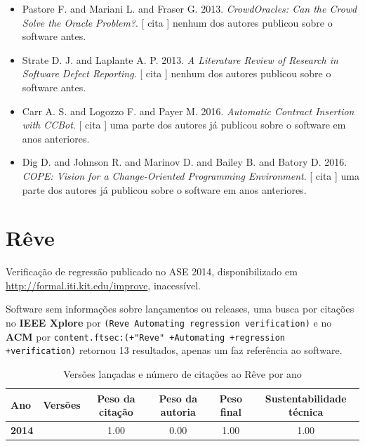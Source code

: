 \begin{itemize}
\item Pastore F. and Mariani L. and Fraser G.
      2013.
        \textit{ CrowdOracles: Can the Crowd Solve the Oracle Problem?}.
      [
          cita
      ]
nenhum dos autores publicou sobre o software antes.
\item Strate D. J. and Laplante A. P.
      2013.
        \textit{ A Literature Review of Research in Software Defect Reporting}.
      [
          cita
      ]
nenhum dos autores publicou sobre o software antes.
\item Carr A. S. and Logozzo F. and Payer M.
      2016.
        \textit{ Automatic Contract Insertion with CCBot}.
      [
          cita
      ]
uma parte dos autores já publicou sobre o software em anos anteriores.
\item Dig D. and Johnson R. and Marinov D. and Bailey B. and Batory D.
      2016.
        \textit{ COPE: Vision for a Change-Oriented Programming Environment}.
      [
          cita
      ]
uma parte dos autores já publicou sobre o software em anos anteriores.
\end{itemize}
\section{Rêve}

Verificação de regressão
publicado no ASE 2014,
disponibilizado em \url{http://formal.iti.kit.edu/improve},
inacessível.

Software sem informações sobre lançamentos ou releases,
uma busca por citações no {\bf IEEE Xplore} por
\texttt{(Reve Automating regression verification)}
e no {\bf ACM} por
\texttt{content.ftsec:(+"Reve" +Automating +regression +verification)}
retornou
13 resultados,
apenas um faz referência ao software.


\begin{table}[H]
\caption{Versões lançadas e número de citações ao Rêve por ano}
\centering
\begin{tabular}{| l | c | c | c | c | c |}
  \hline
  Ano & Versões & Peso da citação & Peso da autoria & Peso final & Sustentabilidade técnica \\
  \hline
            {\bf 2014}
          &
          
          &
          1.00
          &
          0.00
          &
          1.00
          &
            {\color{blue} 1.00}
          \\
\hline
\end{tabular}
\end{table}

